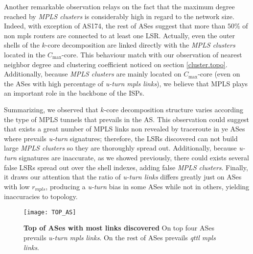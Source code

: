 Another remarkable observation  relays on the fact that the maximum degree reached by \textit{MPLS clusters} is considerably high in regard to the network size. 
Indeed, with exception of AS174, the rest of ASes suggest that more than $50\%$ of non mpls routers are connected  to at least one LSR. 
Actually, even the outer shells of the $k$-core decomposition are linked directly with the \textit{MPLS clusters} located in the $C_{\max}$-core. 
This behaviour match with our observation of nearest neighbor degree and clustering coefficient noticed on section \ref{cluster.topo}. 
Additionally, because \textit{MPLS clusters} are mainly located on $C_{\max}$-core (even on the ASes with high percentage of \textit{u-turn mpls links}), we believe that MPLS plays an important role in the backbone of the ISPs.

Summarizing, we observed that  $k$-core decomposition structure varies according the type of MPLS tunnels that prevails in the AS. 
This observation could suggest that exists a great number of MPLS links non revealed by traceroute in ye ASes where prevails \textit{u-turn} signatures; therefore, the LSRs discovered can not build large \textit{MPLS clusters} so they are thoroughly spread out. 
Additionally, because \textit{u-turn} signatures are inaccurate, as we showed previously, there could exists several false LSRs spread out over the shell indexes, adding false \textit{MPLS clusters}. 
Finally, it draws our attention that the ratio of \textit{u-turn links} differs greatly just on ASes with low $r_{mpls}$, producing a \textit{u-turn} bias in some ASes while not in others, yielding inaccuracies to topology.


\begin{figure}[!htb]
\centering
\texttt{[image: TOP\_AS]}
\caption{\textbf{Top of ASes with most links discovered} On top four ASes prevails \textit{u-turn mpls links}. On the rest of ASes prevails \textit{qttl mpls links}.}
\label{top_as}
\end{figure}

